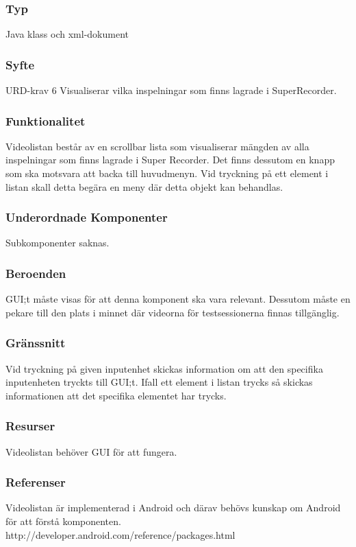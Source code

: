 \subsubsection{Typ}
Java klass och xml-dokument

\subsubsection{Syfte}
URD-krav 6
Visualiserar vilka inspelningar som finns lagrade i SuperRecorder.

\subsubsection{Funktionalitet}
Videolistan består av en scrollbar lista som visualiserar mängden av alla inspelningar som finns lagrade i Super Recorder. Det finns dessutom en knapp som ska motsvara att backa till huvudmenyn. Vid tryckning på ett element i listan skall detta begära en meny där detta objekt kan behandlas.

\subsubsection{Underordnade Komponenter}
Subkomponenter saknas.

\subsubsection{Beroenden}
GUI;t måste visas för att denna komponent ska vara relevant. Dessutom måste en pekare till den plats i minnet där videorna för testsessionerna finnas tillgänglig.

\subsubsection{Gränssnitt}
Vid tryckning på given inputenhet skickas information om att den specifika inputenheten tryckts till GUI;t. Ifall ett element i listan trycks så skickas informationen att det specifika elementet har trycks.

\subsubsection{Resurser}
Videolistan behöver GUI för att fungera.

\subsubsection{Referenser}
Videolistan är implementerad i Android och därav behövs kunskap om Android för att förstå komponenten.
http://developer.android.com/reference/packages.html

